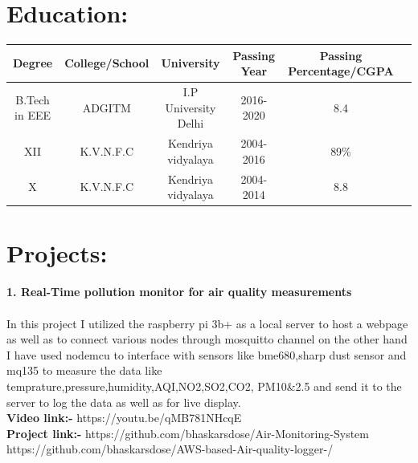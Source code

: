 \documentclass[10pt]{report}
\begin{document}
\section*{Education:} %
\begin{center}
\begin{tabular}{|c|c|c|c|c|c|}
	\hline
	\hspace{2pt}\textbf{Degree} \hspace{2pt} & \hspace{2pt}\textbf{College/School}\hspace{2pt} &\hspace{2pt} \textbf{University}\hspace{2pt} &\hspace{2pt}\textbf{Passing Year}\hspace{2pt} & \hspace{2pt}\textbf{Passing Percentage/CGPA}\hspace{2pt}\\
	\hline

	 B.Tech in EEE & ADGITM & I.P University Delhi & 2016-2020 & 8.4 \\
	XII & K.V.N.F.C & Kendriya vidyalaya & 2004-2016 & 89\%\\
	X & K.V.N.F.C & Kendriya vidyalaya & 2004-2014 & 8.8\\ 
	\hline
\end{tabular}
\end{center}

\section*{Projects:}%
 
\textbf{\large 1. Real-Time pollution monitor for air quality measurements\\[1pt] }
\\In this project I utilized the raspberry pi 3b+ as a local server to host a webpage as well as to connect various nodes through mosquitto channel on the other hand I have used nodemcu to interface with sensors like bme680,sharp dust sensor and mq135 to measure the data like temprature,pressure,humidity,AQI,NO2,SO2,CO2, PM10\&2.5 and send it to the server to log the data as well as for live display.
\\\textbf{Video link:-} https://youtu.be/qMB781NHcqE
\\\textbf{Project link:-} https://github.com/bhaskarsdose/Air-Monitoring-System \\               https://github.com/bhaskarsdose/AWS-based-Air-quality-logger-/\\[2pt]
	 
\end{document}

